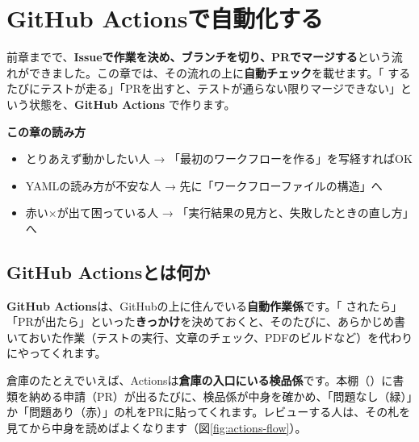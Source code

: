 \chapter{GitHub Actionsで自動化する}

前章までで、\textbf{Issueで作業を決め、ブランチを切り、PRでマージする}という流れができました。この章では、その流れの上に\textbf{自動チェック}を載せます。「 するたびにテストが走る」「PRを出すと、テストが通らない限りマージできない」という状態を、\textbf{GitHub Actions} で作ります。

\begin{hintbox}
\textbf{この章の読み方}
\begin{itemize}[leftmargin=1.4em, nosep]
  \item とりあえず動かしたい人 → 「最初のワークフローを作る」を写経すればOK
  \item YAMLの読み方が不安な人 → 先に「ワークフローファイルの構造」へ
  \item 赤い×が出て困っている人 → 「実行結果の見方と、失敗したときの直し方」へ
\end{itemize}
\end{hintbox}

\section{GitHub Actionsとは何か}

\textbf{GitHub Actions}は、GitHubの上に住んでいる\textbf{自動作業係}です。「 されたら」「PRが出たら」といった\textbf{きっかけ}を決めておくと、そのたびに、あらかじめ書いておいた作業（テストの実行、文章のチェック、PDFのビルドなど）を代わりにやってくれます。

倉庫のたとえでいえば、Actionsは\textbf{倉庫の入口にいる検品係}です。本棚（）に書類を納める申請（PR）が出るたびに、検品係が中身を確かめ、「問題なし（緑）」か「問題あり（赤）」の札をPRに貼ってくれます。レビューする人は、その札を見てから中身を読めばよくなります（図\ref{fig:actions-flow}）。

